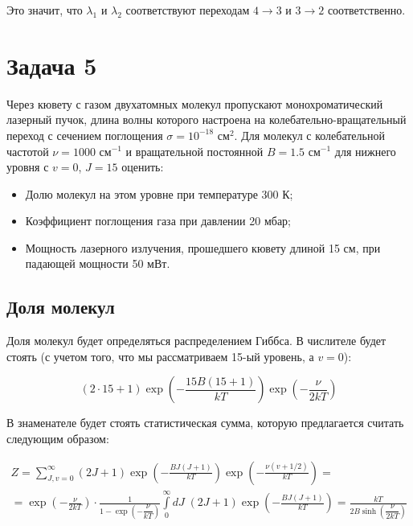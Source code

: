 \documentclass[a4paper, 12pt]{article}
\begin{document}
Это значит, что $\lambda_1$ и $\lambda_2$ соответствуют переходам $4\rightarrow 3$ и $3\rightarrow 2$ соответственно.

\section*{Задача 5}

Через кювету с газом двухатомных молекул пропускают монохроматический лазерный пучок, длина волны которого настроена на колебательно-вращательный переход с сечением поглощения $\sigma =  10^{-18}$ см$^2$. Для молекул с колебательной частотой $\nu = 1000$ см$^{-1}$ и вращательной постоянной $B = 1.5$ см$^{-1}$ для нижнего уровня с $v = 0$, $J=15$ оценить:
\begin{itemize}
	\item Долю молекул на этом уровне при температуре 300 К;
	
	\item Коэффициент поглощения газа при давлении 20 мбар;
	
	\item Мощность лазерного излучения, прошедшего кювету длиной 15 см, при падающей мощности 50 мВт.
\end{itemize}

\subsection*{Доля молекул}

Доля молекул будет определяться распределением Гиббса. В числителе будет стоять (с учетом того, что мы рассматриваем 15-ый уровень, а $v = 0$):

\begin{equation}
	(2 \cdot 15 + 1) \exp\left(-\frac{15 B(15 + 1)}{kT}\right) \exp\left(-\frac{\nu}{2 k T}\right)
\end{equation}

В знаменателе будет стоять статистическая сумма, которую предлагается считать следующим образом:

\begin{align*}
	Z = \sum_{J, v = 0}^\infty (2 J + 1) \exp\left(-\frac{BJ(J + 1)}{kT}\right) \exp\left(-\frac{\nu (v + 1/2)}{kT}\right) =\\
	= \exp\left(-\frac{\nu}{2kT}\right) \cdot \frac{1}{1 - \exp\left(-\dfrac{\nu}{kT}\right)} \int\limits_0^\infty dJ \; (2J + 1) \exp\left(-\frac{BJ(J + 1)}{kT}\right) = \frac{kT}{2B \sinh\left(\dfrac{\nu}{2 k T}\right)}
\end{align*}
\end{document}
